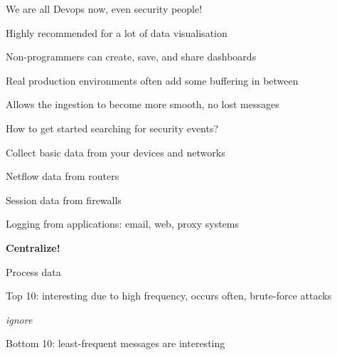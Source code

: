 \documentclass[Screen16to9,17pt]{foils}
\begin{document}
\begin{list2}
\item We are all Devops now, even security people!
\item Highly recommended for a lot of data visualisation
\item Non-programmers can create, save, and share dashboards
\end{list2}




\begin{list2}
\item Real production environments often add some buffering in between
\item Allows the ingestion to become more smooth, no lost messages
\end{list2}




\begin{list1}
\item How to get started searching for security events?
\item Collect basic data from your devices and networks
\begin{list2}
\item Netflow data from routers
\item Session data from firewalls
\item Logging from applications: email, web, proxy systems
\end{list2}
\item {\bf Centralize!}
\item Process data
\begin{list2}
\item Top 10: interesting due to high frequency, occurs often, brute-force attacks
\item {\it ignore}
\item Bottom 10: least-frequent messages are interesting
\end{list2}
\end{list1}




\end{document}
